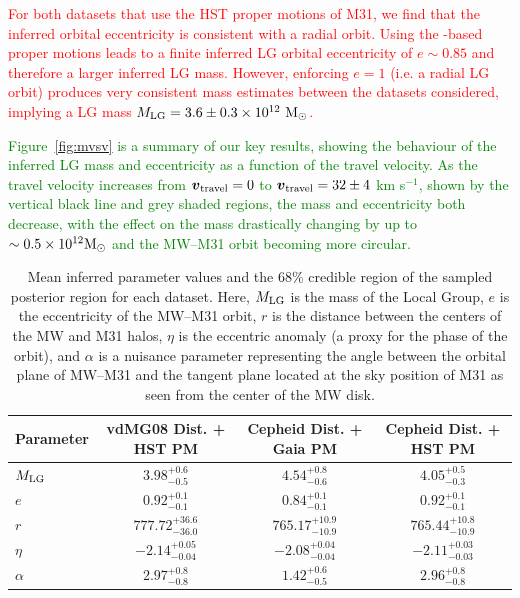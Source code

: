 \documentclass[twocolumn]{aastex631}
\newcommand{\remove}[1]{\textcolor{red}{#1}}
\newcommand{\add}[1]{\textcolor{green}{#1}}
\newcommand{\mlg}{\ensuremath{M_{\rm LG}}}
\newcommand{\bov}{\ensuremath{\boldsymbol{v}}}
\newcommand{\vtrav}{\ensuremath{\bov_{\rm travel}}}
\begin{document}
\remove{For both datasets that use the HST proper motions of M31, we
find that the inferred orbital eccentricity is consistent with a radial orbit.
Using the \gaia-based proper motions \citep{Salomon2021} leads to a finite
inferred LG orbital eccentricity of $e\sim 0.85$ and therefore a larger inferred
LG mass.
However, enforcing $e=1$ (i.e. a radial LG orbit) produces very consistent mass
estimates between the datasets considered, implying a LG mass $\mlg = 3.6
\pm 0.3 \times 10^{12}~\Msun$.}

\add{Figure~\ref{fig:mvsv} is a summary of our key results, showing the
behaviour of the inferred LG mass and eccentricity as a function of the travel
velocity. As the travel velocity increases from $\vtrav=0$ to $\vtrav=32\pm4$
km s$^{-1}$, shown by the vertical black line and grey shaded regions, the mass
and eccentricity both decrease, with the effect on the mass drastically changing
by up to $\sim0.5\times 10^{12}\mathrm{M}_\odot$ and the MW--M31 orbit becoming more
circular.}

\begin{table}
  \begin{tabular}{lc|c|c}
    \hline\hline
    Parameter  & \textbf{vdMG08 Dist. + HST PM} & \textbf{Cepheid Dist. + Gaia PM} & \textbf{Cepheid Dist. + HST PM}\\\hline
    $\mlg$ & $3.98^{+0.6}_{-0.5}$ & $4.54^{+0.8}_{-0.6} $ & $4.05^{+0.5}_{-0.3} $ \\
    $e$ & $0.92^{+0.1}_{-0.1}$ & $0.84^{+0.1}_{-0.1}$ & $0.92^{+0.1}_{-0.1} $ \\
    $r$ & $777.72^{+36.6}_{-36.0}$ & $765.17^{+10.9}_{-10.9}$ & $765.44^{+10.8}_{-10.9} $ \\
    $\eta$ & $-2.14^{+0.05}_{-0.04}$ & $-2.08^{+0.04}_{-0.04}$ & $-2.11^{+0.03}_{-0.03} $\\
    $\alpha$ & $2.97^{+0.8}_{-0.8}$ & $1.42^{+0.6}_{-0.5} $ &  $2.96^{+0.8}_{-0.8} $ \\
  \hline\hline
  \end{tabular}
  \caption{\label{table:convergedparams}Mean inferred parameter values and the
  68\% credible region of the sampled posterior region for each dataset.
  Here, $\mlg$ is the mass of the Local Group, $e$ is the eccentricity of the
  MW--M31 orbit, $r$ is the distance between the centers of the MW and M31
  halos, $\eta$ is the eccentric anomaly (a proxy for the phase of the orbit),
  and $\alpha$ is a nuisance parameter representing the angle between the
  orbital plane of MW--M31 and the tangent plane located at the sky position of
  M31 as seen from the center of the MW disk.}
\end{table}
\end{document}
